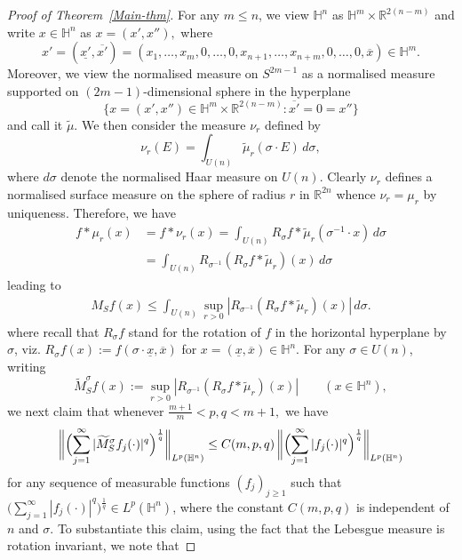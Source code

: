 \documentclass[11pt]{amsart}
\newcommand {\R}{\mathbb R}
\newcommand{\Ha}{\mathbb{H}^n}
\theoremstyle{definition}
\numberwithin{equation}{section}
\begin{document}
\begin{proof}[Proof of Theorem~\ref{Main-thm}]
    For any $m\leq n$, we view $\Ha$ as $\mathbb{H}^{m}\times \R^{2(n-m)}$ and write $x\in \Ha$ as $x=({x'}, {x''}),$ where $$x'=(\underline{x'}, \overline{x'})=(x_{1}, \ldots, x_{m},0, \ldots, 0,x_{n+1}, \ldots, x_{n+m}, 0,\ldots, 0, \overline{x})\in \mathbb{H}^{m}.$$
    Moreover, we view the normalised measure on $S^{2m-1}$ as a normalised measure supported on $(2m-1)$-dimensional sphere in the hyperplane $$\{x=({x'}, {x''})\in \mathbb{H}^{m}\times \R^{2(n-m)}: \overline{x'}=0=x''\}$$
    and call it $\tilde{\mu}.$ We then consider the measure $\nu_r$ defined by 
    $$\nu_r(E)=\int_{U(n)} \tilde{\mu}_r(\sigma \cdot E)\,d\sigma,$$
    where $d\sigma$ denote the normalised Haar measure on $U(n).$ Clearly $\nu_r$ defines a normalised surface measure on the sphere of radius $r$ in $\mathbb{R}^{2n}$ whence $\nu_r=\mu_r$ by uniqueness. Therefore, we have 
    \begin{align*}
        f\ast \mu_r(x)&=f\ast \nu_r(x)= \int_{U(n)}R_{\sigma}f \ast \tilde{\mu}_r(\sigma^{-1}\cdot x)\,d\sigma\\
        \nonumber &= \int_{U(n)}R_{\sigma^{-1}}\left(R_{\sigma}f \ast \tilde{\mu}_r\right)(x)\,d\sigma
    \end{align*}
    leading to 
    \begin{align}
    \label{dombyavgofrot}
        M_Sf(x)\leq \int_{U(n)} \sup_{r>0}|R_{\sigma^{-1}}\left(R_{\sigma}f \ast \tilde{\mu}_r\right)( x)|\, d\sigma.
    \end{align}
    where recall that $R_{\sigma}f$ stand for the rotation of $f$ in the horizontal hyperplane by $\sigma$, viz. $R_{\sigma}f(x):=f(\sigma\cdot \underline{x},\overline{x})$ for $x=(\underline{x},\overline{x})\in\mathbb{H}^n.$  For any $\sigma\in U(n)$, writing $$\widetilde{M}^{\sigma}_Sf(x):= \sup_{r>0}|R_{\sigma^{-1}}\left(R_{\sigma}f \ast \tilde{\mu}_r\right)( x)| \quad\quad (x\in \Ha),$$ we next claim that whenever $\frac{m+1}{m}<p,q< {m+1},$ we have
    \begin{equation}
    \label{dombydimless}
\biggl\|\Bigl(\sum_{j=1}^{\infty}|\widetilde{M}^{\sigma}_{S}f_j(\cdot)|^q\Bigr)^\frac{1}{q}\biggr\|_{L^p(\Ha)}\leq C({m, p, q})\,\biggl\|\Bigl(\sum_{j=1}^{\infty}|f_j(\cdot)|^q\Bigr)^\frac{1}{q}\biggr\|_{L^p(\Ha)}
    \end{equation}
 for any  sequence of measurable functions $(f_j)_{j\geq1}$ such that  $\bigl(\sum_{j=1}^{\infty}|f_j(\cdot)|^q\bigr)^\frac{1}{q} \in L^p(\Ha)$, where the constant $C({m,p,q})$ is independent of $n$ and $\sigma.$ To substantiate this claim, using the fact that the Lebesgue measure is rotation invariant, we note that 

\end{proof}
\end{document}
